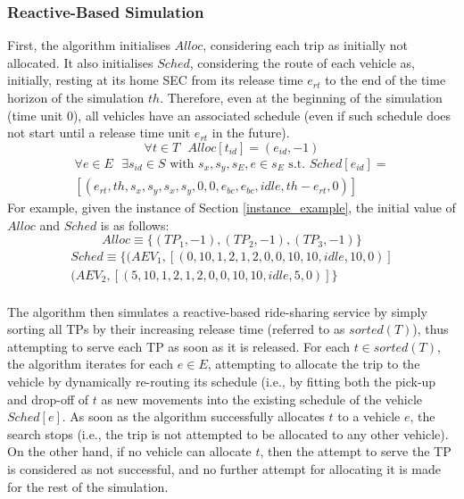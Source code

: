\subsubsection{Reactive-Based Simulation}
\label{reactive_based_simulation}

First, the algorithm initialises $Alloc$, considering each trip as initially not allocated.  It also initialises $Sched$, considering the route of each vehicle as, initially, resting at its home SEC from its release time $e_{rt}$ to the end of the time horizon of the simulation $th$.  
Therefore,  even at the beginning of the simulation (time unit 0), all vehicles have an associated schedule (even if such schedule does not start until a release time unit $e_{rt}$ in the future). 
\[
\forall t\in T\text{ }Alloc[t_{id}] = (e_{id}, -1) 
\]
\begin{align*}
\forall e\in E \text{ } \exists s_{id} \in S \text{ with } s_x, s_y, s_E, e\in s_E \text{ s.t.  } Sched[e_{id}] =\\ 
[( e_{rt}, th, s_x, s_y, s_x, s_y, 0, 0, e_{bc}, e_{bc}, idle, th-e_{rt}, 0 )]
\end{align*}	
For example, given the instance of Section \ref{instance_example}, the initial value of $Alloc$ and $Sched$ is as follows: 
\[
Alloc \equiv \{ (TP_1, -1),  (TP_2, -1),  (TP_3, -1) \}
\]
\begin{align*}
Sched \equiv \{(AEV_1,  [ ( 0, 10, 1, 2, 1, 2, 0, 0, 10, 10, idle, 10, 0 )]\\										 
(AEV_2,  [ ( 5, 10, 1, 2, 1, 2, 0, 0, 10, 10, idle, 5, 0 )] \}\\ 
\end{align*}	

The algorithm then simulates a reactive-based ride-sharing service by simply sorting all TPs by their increasing release time (referred to as $sorted(T)$),  thus attempting to serve each TP as soon as it is released.  For each $t \in sorted(T)$, the algorithm iterates for each $e \in E$, attempting to allocate the trip to the vehicle by dynamically re-routing its schedule (i.e., by fitting both the pick-up and drop-off of $t$ as new movements into the existing schedule of the vehicle $Sched[e]$.  As soon as the algorithm successfully allocates $t$ to a vehicle $e$,  the search stops (i.e., the trip is not attempted to be allocated to any other vehicle). On the other hand, if no vehicle can allocate $t$, then the attempt to serve the TP is considered as not successful, and no further attempt for allocating it is made for the rest of the simulation. 

